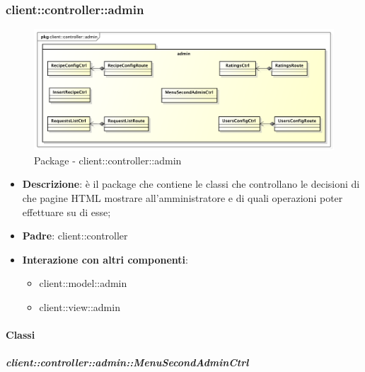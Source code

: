 

\subsubsection{client::controller::admin} %
\label{ssub:bdsm_app_client_controller_admin}
\begin{figure}[htbp]
	\centering
	\centerline{\includegraphics[scale=0.45]{./images/client/client_controller_admin.pdf}}
	\caption{Package - client::controller::admin}
\end{figure}

\begin{itemize}
	\item \textbf{Descrizione}: è il package che contiene le classi che controllano le decisioni di che pagine HTML mostrare all'amministratore e di quali operazioni poter effettuare su di esse;
	\item \textbf{Padre}: client::controller
	\item \textbf{Interazione con altri componenti}:
		\begin{itemize}
			\item client::model::admin
			\item client::view::admin
		\end{itemize}
\end{itemize}

	\paragraph{Classi} %
		\subparagraph{client::controller::admin::MenuSecondAdminCtrl} %
		\label{subp:bdsm_app_client_controller_admin_menusecondadminctrl}

